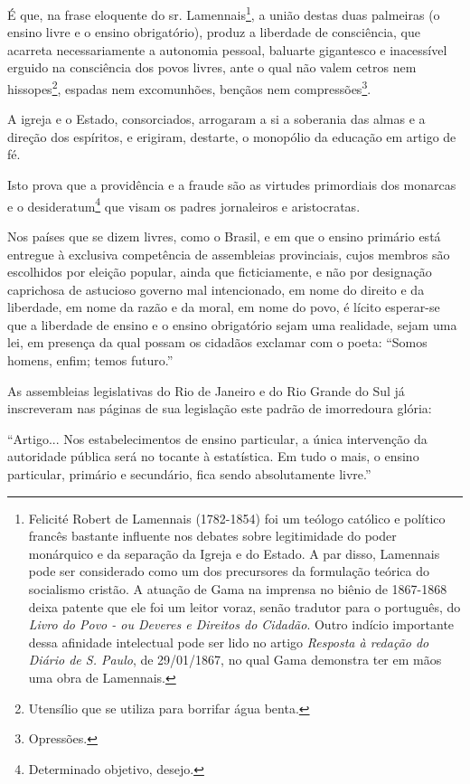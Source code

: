 É que, na frase eloquente do sr. Lamennais\footnote{Felicité Robert de
  Lamennais (1782-1854) foi um teólogo católico e político francês
  bastante influente nos debates sobre legitimidade do poder monárquico
  e da separação da Igreja e do Estado. A par disso, Lamennais pode ser
  considerado como um dos precursores da formulação teórica do
  socialismo cristão. A atuação de Gama na imprensa no biênio de
  1867-1868 deixa patente que ele foi um leitor voraz, senão tradutor
  para o português, do \emph{Livro do Povo - ou Deveres e Direitos do
  Cidadão}. Outro indício importante dessa afinidade intelectual pode
  ser lido no artigo \emph{Resposta à redação do Diário de S. Paulo}, de
  29/01/1867, no qual Gama demonstra ter em mãos uma obra de Lamennais.},
a união destas duas palmeiras (o ensino livre e o ensino obrigatório),
produz a liberdade de consciência, que acarreta necessariamente a
autonomia pessoal, baluarte gigantesco e inacessível erguido na
consciência dos povos livres, ante o qual não valem cetros nem
hissopes\footnote{Utensílio que se utiliza para borrifar água benta.},
espadas nem excomunhões, bençãos nem compressões\footnote{Opressões.}.

A igreja e o Estado, consorciados, arrogaram a si a soberania das almas
e a direção dos espíritos, e erigiram, destarte, o monopólio da educação
em artigo de fé.

Isto prova que a providência e a fraude são as virtudes primordiais dos
monarcas e o desideratum\footnote{Determinado objetivo, desejo.} que
visam os padres jornaleiros e aristocratas.

Nos países que se dizem livres, como o Brasil, e em que o ensino
primário está entregue à exclusiva competência de assembleias
provinciais, cujos membros são escolhidos por eleição popular, ainda que
ficticiamente, e não por designação caprichosa de astucioso governo mal
intencionado, em nome do direito e da liberdade, em nome da razão e da
moral, em nome do povo, é lícito esperar-se que a liberdade de ensino e
o ensino obrigatório sejam uma realidade, sejam uma lei, em presença da
qual possam os cidadãos exclamar com o poeta: ``Somos homens, enfim;
temos futuro.''

As assembleias legislativas do Rio de Janeiro e do Rio Grande do Sul já
inscreveram nas páginas de sua legislação este padrão de imorredoura
glória:

``Artigo... Nos estabelecimentos de ensino particular, a única
intervenção da autoridade pública será no tocante à estatística. Em tudo
o mais, o ensino particular, primário e secundário, fica sendo
absolutamente livre.''

